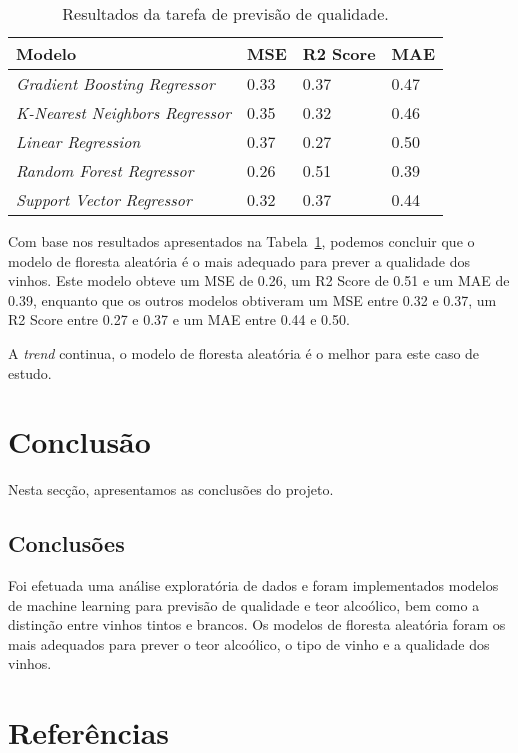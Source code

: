 \documentclass{article}
\begin{document}
\begin{table}[ht]
  \centering
  \begin{tabular}{@{}llll@{}}
    \toprule
    Modelo & MSE & R2 Score & MAE \\ \midrule
    \textit{Gradient Boosting Regressor} & 0.33 & 0.37 & 0.47 \\
    \textit{K-Nearest Neighbors Regressor} & 0.35 & 0.32 & 0.46 \\
    \textit{Linear Regression} & 0.37 & 0.27 & 0.50 \\
    \textit{Random Forest Regressor} & 0.26 & 0.51 & 0.39 \\
    \textit{Support Vector Regressor} & 0.32 & 0.37 & 0.44 \\ \bottomrule
  \end{tabular}
  \caption{Resultados da tarefa de previsão de qualidade.}
  \label{tab:task3_results}
\end{table}

Com base nos resultados apresentados na Tabela~\ref{tab:task3_results}, podemos concluir que o modelo de floresta aleatória é o mais adequado para prever a qualidade dos vinhos. Este modelo obteve um MSE de 0.26, um R2 Score de 0.51 e um MAE de 0.39, enquanto que os outros modelos obtiveram um MSE entre 0.32 e 0.37, um R2 Score entre 0.27 e 0.37 e um MAE entre 0.44 e 0.50.

A \textit{trend} continua, o modelo de floresta aleatória é o melhor para este caso de estudo.

\section{Conclusão}
Nesta secção, apresentamos as conclusões do projeto.

\subsection{Conclusões}
Foi efetuada uma análise exploratória de dados e foram implementados modelos de machine learning para previsão de qualidade e teor alcoólico, bem como a distinção entre vinhos tintos e brancos. Os modelos de floresta aleatória foram os mais adequados para prever o teor alcoólico, o tipo de vinho e a qualidade dos vinhos.

\section{Referências}
\end{document}
